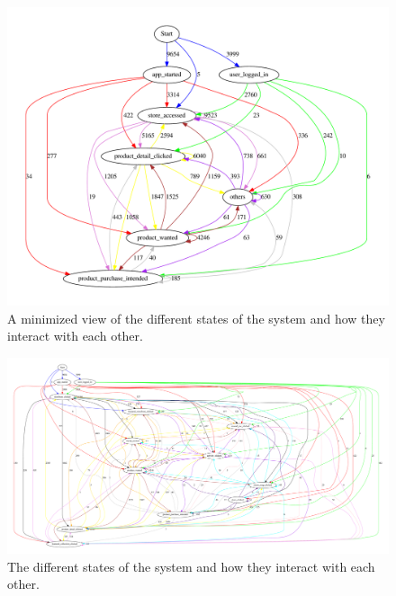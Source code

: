     \begin{figure}[H]
        \includegraphics[width=5in]{image/statesInteractionTrue-gvfile.pdf}
        \centering
        \caption[Minimized states in session and how they interact]{A minimized view of the different states of the system and how they interact with each other.}
        \label{figure:minStatesInteractions}
    \end{figure}

    \begin{figure}[H]
        \includegraphics[width=5in]{image/statesInteractionFalse-gvfile.pdf}
        \centering
        \caption[States in session and how they interact]{The different states of the system and how they interact with each other.}
        \label{figure:statesInteractions}
    \end{figure}


